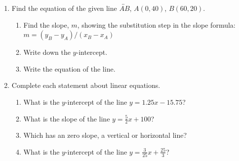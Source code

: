 \documentclass[12pt, twoside]{article}
\begin{document}
\begin{enumerate}
\newpage
\item Find the equation of the given line $\overleftrightarrow{AB}$, $A(0,40)$, $B(60,20)$.
\begin{multicols}{2}
    \begin{enumerate}[itemsep=1.2cm]
      \item Find the slope, $m$, showing the substitution step in the slope formula: \\[0.25cm]
      $\displaystyle m = (y_B - y_A)/(x_B - x_A)$
      \item Write down the $y$-intercept.
      \item Write the equation of the line.
      \end{enumerate}
      \begin{flushright}
        \end{flushright}
\end{multicols}

\newpage
\item Complete each statement about linear equations.
\begin{enumerate}[itemsep=0.5cm]
  \item What is the $y$-intercept of the line $y = 1.25x - 15.75$?
  \item What is the slope of the line $\displaystyle y = \frac{5}{2}x + 100$?
  \item Which has an zero slope, a vertical or horizontal line?
  \item What is the $y$-intercept of the line $\displaystyle y = \frac{3}{25}x + \frac{25}{3}$?

\end{enumerate}


\end{enumerate}
\end{document}
